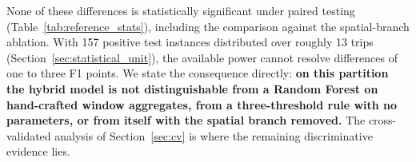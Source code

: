 \documentclass[journal]{IEEEtran}
\begin{document}
None of these differences is statistically significant under paired testing (Table~\ref{tab:reference_stats}), including the comparison against the spatial-branch ablation. With 157 positive test instances distributed over roughly 13 trips (Section~\ref{sec:statistical_unit}), the available power cannot resolve differences of one to three F1 points. We state the consequence directly: \textbf{on this partition the hybrid model is not distinguishable from a Random Forest on hand-crafted window aggregates, from a three-threshold rule with no parameters, or from itself with the spatial branch removed.} The cross-validated analysis of Section~\ref{sec:cv} is where the remaining discriminative evidence lies.

\begin{table}[!htbp]
  \centering
  \caption{\textbf{[Fixed partition, window-level tests]}~ Paired comparisons against the hybrid LSTM--GAT model. The two
  $\Delta$F1 columns are \emph{different quantities} and are reported
  separately: the first is the difference of five-seed means, the second is
  the difference on the median seed, which is the run the interval and the
  test are computed on. The interval is the quantity that brackets the
  median-seed difference, not the mean.}
  \label{tab:reference_stats}
  \renewcommand{\arraystretch}{1.15}
\end{table}
\end{document}
